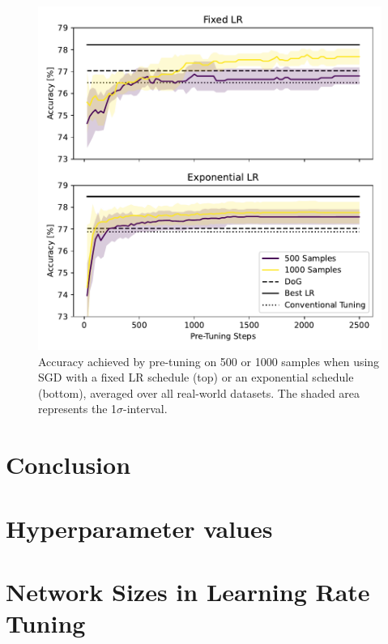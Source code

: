 \documentclass[letterpaper]{article} %
\begin{document}
\begin{figure}[hb]
	\centering
	\includegraphics[width=.47\textwidth]{figures/pretune_1x64_fixed_vs_exp_schedule.pdf}
	\caption{Accuracy achieved by pre-tuning on 500 or 1000 samples when using SGD with a fixed LR schedule (top) or an exponential schedule (bottom), averaged over all real-world datasets. The shaded area represents the 1$\sigma$-interval.}\label{fig:pretune_fixed_vs_exp_lr}
\end{figure}







\section{Conclusion}




\appendix

\section{Hyperparameter values}\label{app:hyperparams}

\section{Network Sizes in Learning Rate Tuning}\label{app:pretune_model_sizes}
\end{document}
